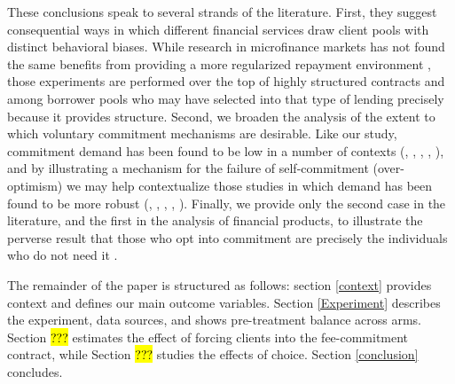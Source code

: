 \documentclass[oneside,11pt]{article}
\begin{document}
These conclusions speak to several strands of the literature.  First, they suggest consequential ways in which different financial services draw client pools with distinct behavioral biases.  While research in microfinance markets has not found the same benefits from providing a more regularized repayment environment \citep{Pande}, those experiments are performed over the top of highly structured contracts and among borrower pools who may have selected into that type of lending precisely because it provides structure.  Second, we broaden the analysis of the extent to which voluntary commitment mechanisms are desirable.  Like our study, commitment demand has been found to be low in a number of contexts (\cite{Ashraf}, \cite{Gine}, \cite{Ted}, \cite{Royer}, \cite{Sprenger}), and by illustrating a mechanism for the failure of self-commitment (over-optimism) we may help contextualize those studies in which demand has been found to be more robust (\cite{Kremer},  \cite{Casaburi}, \cite{Alcohol}, \cite{AprajitP&P}, \cite{Pascaline}). Finally, we provide only the second case in the literature, and the first in the analysis of financial products, to illustrate the perverse result that those who opt into commitment are precisely the individuals who do not need it \citep{Sprenger}.


The remainder of the paper is structured as follows:  section \ref{context} provides context and defines our main outcome variables. Section \ref{Experiment} describes the experiment, data sources, and shows pre-treatment balance across arms. Section \hl{???} estimates the effect of forcing clients into the fee-commitment contract, while Section \hl{???} studies the effects of choice. Section \ref{conclusion} concludes.




\end{document}
